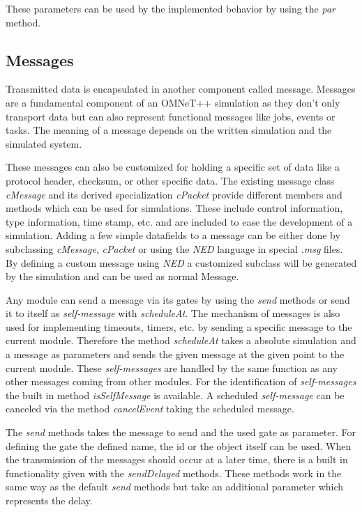 These parameters can be used by the implemented behavior by using the \emph{par} method. \cite[section 3.6]{omnet_manual}

\subsection{Messages}
\label{sec:omnet_components_messages}
Transmitted data is encapsulated in another component called message.
Messages are a fundamental component of an OMNeT++ simulation as they don't only transport data but can also represent functional messages like jobs, events or tasks.
The meaning of a message depends on the written simulation and the simulated system. \cite[chapter 5]{omnet_manual}

These messages can also be customized for holding a specific set of data like a protocol header, checksum, or other specific data.
The existing message class \emph{cMessage} and its derived specialization \emph{cPacket} provide different members and methods which can be used for simulations.
These include control information, type information, time stamp, etc. and are included to ease the development of a simulation.
Adding a few simple datafields to a message can be either done by subclassing \emph{cMessage}, \emph{cPacket} or using the \emph{NED} language in special \emph{.msg} files.
By defining a custom message using \emph{NED} a customized subclass will be generated by the simulation and can be used as normal Message. \cite[chapter 6]{omnet_manual}

Any module can send a message via its gates by using the \emph{send} methods or send it to itself as \emph{self-message} with \emph{scheduleAt}.
The mechanism of messages is also used for implementing timeouts, timers, etc. by sending a specific message to the current module.
Therefore the method \emph{scheduleAt} takes a absolute simulation and a message as parameters and sends the given message at the given point to the current module.
These \emph{self-messages} are handled by the same function as any other messages coming from other modules.
For the identification of \emph{self-messages} the built in method \emph{isSelfMessage} is available.
A scheduled \emph{self-message} can be canceled via the method \emph{cancelEvent} taking the scheduled message. \cite[section 4.7.1]{omnet_manual}

The \emph{send} methods takes the message to send and the used gate as parameter.
For defining the gate the defined name, the id or the object itself can be used. \cite[section 4.7.2]{omnet_manual}
When the transmission of the messages should occur at a later time, there is a built in functionality given with the \mbox{\emph{sendDelayed}} methods.
These methods work in the same way as the default \emph{send} methods but take an additional parameter which represents the delay. \cite[section 4.7.6]{omnet_manual}

